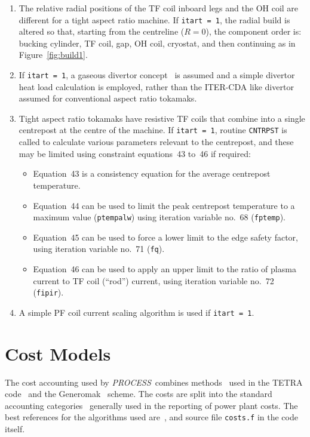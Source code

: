 \documentclass[11pt,a4paper]{report}
\newcommand{\PS}{\mbox{\it PROCESS\/ }}
\begin{document}
\begin{enumerate}
\item The relative radial positions of the TF coil inboard legs and the OH coil
are different for a tight aspect ratio machine. If \texttt{itart = 1}, the
radial build is altered so that, starting from the centreline ($R = 0$), the
component order is: bucking cylinder, TF coil, gap, OH coil, cryostat, and
then continuing as in Figure~\ref{fig:build1}.
\item If \texttt{itart = 1}, a gaseous divertor concept~\cite{storac} is
assumed and a simple divertor heat load calculation is employed, rather than
the ITER-CDA like divertor assumed for conventional aspect ratio tokamaks.
\item Tight aspect ratio tokamaks have resistive TF coils that combine into a
single centrepost at the centre of the machine. If \texttt{itart = 1}, routine
\texttt{CNTRPST} is called to calculate various parameters relevant to the
centrepost, and these may be limited using constraint equations~43 to~46 if
required:
\begin{itemize}
\item Equation~43 is a consistency equation for the average centrepost
temperature.
\item Equation~44 can be used to limit the peak centrepost temperature to a
maximum value (\texttt{ptempalw}) using iteration variable no.\ 68
(\texttt{fptemp}).
\item Equation~45 can be used to force a lower limit to the edge safety
factor, using iteration variable no.\ 71 (\texttt{fq}).
\item Equation~46 can be used to apply an upper limit to the ratio of plasma
current to TF coil (``rod'') current, using iteration variable no.\ 72
(\texttt{fipir}).
\end{itemize}
\item A simple PF coil current scaling algorithm is used if \texttt{itart = 1}.
\end{enumerate}

\section{Cost Models}

The cost accounting used by \PS combines methods~\cite{cost1} used in the
TETRA code~\cite{tetra} and the Generomak~\cite{generomak} scheme.  The costs
are split into the standard accounting categories~\cite{cost2} generally used
in the reporting of power plant costs. The best references for the algorithms
used are~\cite{storac}, and source file {\tt costs.f} in the code itself.
\setlength{\parskip}{5mm}
\end{document}
